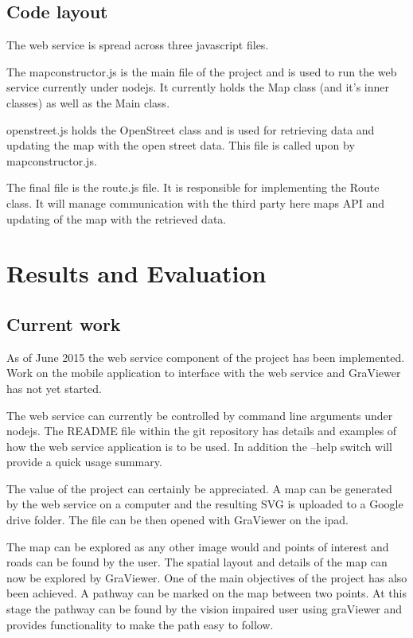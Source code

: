 \documentclass[11pt,twoside,a4paper]{article}
\begin{document}
\subsection{Code layout}

The web service is spread across three javascript files.

The mapconstructor.js is the main file of the project and is used to run
the web service currently under nodejs. It currently holds the Map class
(and it's inner classes) as well as the Main class.

openstreet.js holds the OpenStreet class and is used for retrieving data
and updating the map with the open street data. This file is called upon
by mapconstructor.js.

The final file is the route.js file. It is responsible for implementing
the Route class. It will manage communication with the third party
here maps API and updating of the map with the retrieved data.

\section{Results and Evaluation}
\subsection{Current work}
As of June 2015 the web service component of the project has been
implemented. Work on the mobile application to interface with the web
service and GraViewer has not yet started.

The web service can currently be controlled by command line arguments
under nodejs. The README file within the git repository has details and
examples of how the web service application is to be used. In addition
the --help switch will provide a quick usage summary.

The value of the project can certainly be appreciated. A map can be
generated by the web service on a computer and the resulting SVG is
uploaded to a Google drive folder. The file can be then opened with
GraViewer on the ipad.

The map can be explored as any other image would and points of interest
and roads can be found by the user. The spatial layout and details of
the map can now be explored by GraViewer. One of the main objectives of
the project has also been achieved. A pathway can be marked on the map
between two points. At this stage the pathway can be found by the vision impaired user using graViewer and provides functionality to make
the path easy to follow.
\end{document}
